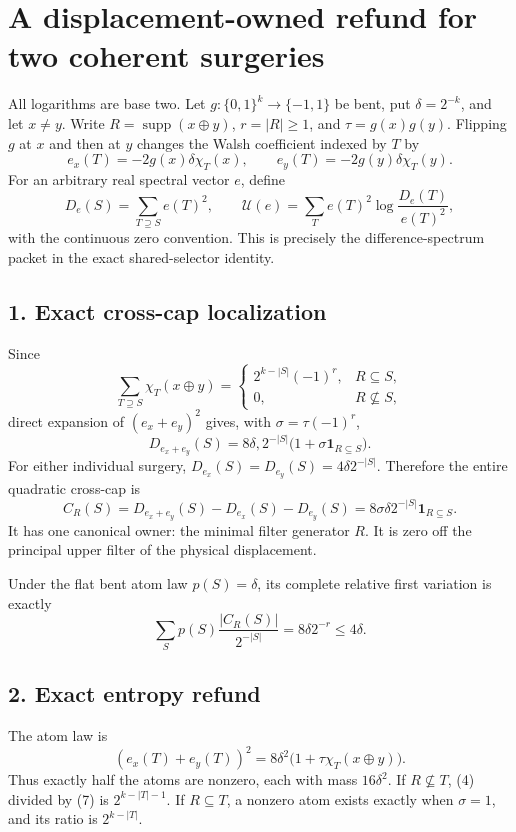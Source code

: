 \section*{A displacement-owned refund for two coherent surgeries}

All logarithms are base two.  Let $g:\{0,1\}^k\to\{-1,1\}$ be bent,
put $\delta=2^{-k}$, and let $x\ne y$.  Write
$R=\operatorname{supp}(x\oplus y)$, $r=|R|\ge1$, and
$\tau=g(x)g(y)$.  Flipping $g$ at $x$ and then at $y$ changes the Walsh
coefficient indexed by $T$ by
\[
 e_x(T)=-2g(x)\delta\chi_T(x),\qquad
 e_y(T)=-2g(y)\delta\chi_T(y).
\tag{1}
\]
For an arbitrary real spectral vector $e$, define
\[
 D_e(S)=\sum_{T\supseteq S}e(T)^2,
 \qquad
 \mathcal U(e)=\sum_T e(T)^2\log\frac{D_e(T)}{e(T)^2},
\tag{2}
\]
with the continuous zero convention.  This is precisely the
difference-spectrum packet in the exact shared-selector identity.

\subsection*{1. Exact cross-cap localization}

Since
\[
 \sum_{T\supseteq S}\chi_T(x\oplus y)
 =\begin{cases}
  2^{k-|S|}(-1)^r,&R\subseteq S,\\
  0,&R\not\subseteq S,
 \end{cases}
\tag{3}
\]
direct expansion of $(e_x+e_y)^2$ gives, with
$\sigma=\tau(-1)^r$,
\[
 \boxed{D_{e_x+e_y}(S)
 =8\delta,2^{-|S|}\bigl(1+\sigma\mathbf1_{R\subseteq S}\bigr).}
\tag{4}
\]
For either individual surgery,
$D_{e_x}(S)=D_{e_y}(S)=4\delta2^{-|S|}$.  Therefore the entire quadratic
cross-cap is
\[
 \boxed{C_R(S)=D_{e_x+e_y}(S)-D_{e_x}(S)-D_{e_y}(S)
 =8\sigma\delta2^{-|S|}\mathbf1_{R\subseteq S}.}
\tag{5}
\]
It has one canonical owner: the minimal filter generator $R$.  It is zero
off the principal upper filter of the physical displacement.

Under the flat bent atom law $p(S)=\delta$, its complete relative first
variation is exactly
\[
 \sum_Sp(S)\frac{|C_R(S)|}{2^{-|S|}}
 =8\delta2^{-r}\le4\delta.
\tag{6}
\]

\subsection*{2. Exact entropy refund}

The atom law is
\[
 (e_x(T)+e_y(T))^2
 =8\delta^2\bigl(1+\tau\chi_T(x\oplus y)\bigr).
\tag{7}
\]
Thus exactly half the atoms are nonzero, each with mass $16\delta^2$.
If $R\not\subseteq T$, (4) divided by (7) is
$2^{k-|T|-1}$.  If $R\subseteq T$, a nonzero atom exists exactly when
$\sigma=1$, and its ratio is $2^{k-|T|}$.

